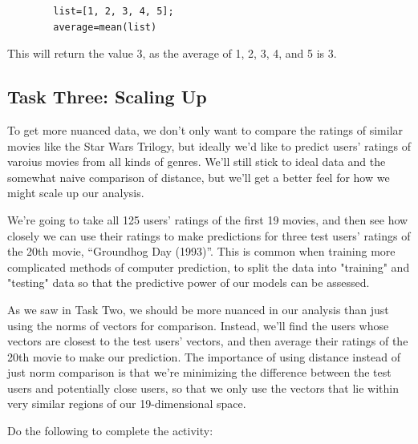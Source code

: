\documentclass{ximera}
\begin{document}
\begin{hint}
      \begin{verbatim}
        list=[1, 2, 3, 4, 5];
        average=mean(list)        
      \end{verbatim}



      This will return the value 3, as the average of 1, 2, 3, 4, and 5 is 3.

    \end{hint}


      
      
  \subsection{Task Three: Scaling Up}
  
    To get more nuanced data, we don't only want to compare the ratings of similar movies like the Star Wars Trilogy, but ideally we'd like to predict users' ratings of varoius movies from all kinds of genres. We'll still stick to ideal data and the somewhat naive comparison of distance, but we'll get a better feel for how we might scale up our analysis.

    We're going to take all 125 users' ratings of the first 19 movies, and then see how closely we can use their ratings to make predictions for three test users' ratings of the 20th movie, ``Groundhog Day (1993)''. This is common when training more complicated methods of computer prediction, to split the data into "training" and "testing" data so that the predictive power of our models can be assessed.

    As we saw in Task Two, we should be more nuanced in our analysis than just using the norms of vectors for comparison. Instead, we'll find the users whose vectors are closest to the test users' vectors, and then average their ratings of the 20th movie to make our prediction. The importance of using distance instead of just norm comparison is that we're minimizing the difference between the test users and potentially close users, so that we only use the vectors that lie within very similar regions of our 19-dimensional space.

    Do the following to complete the activity:
\end{document}
